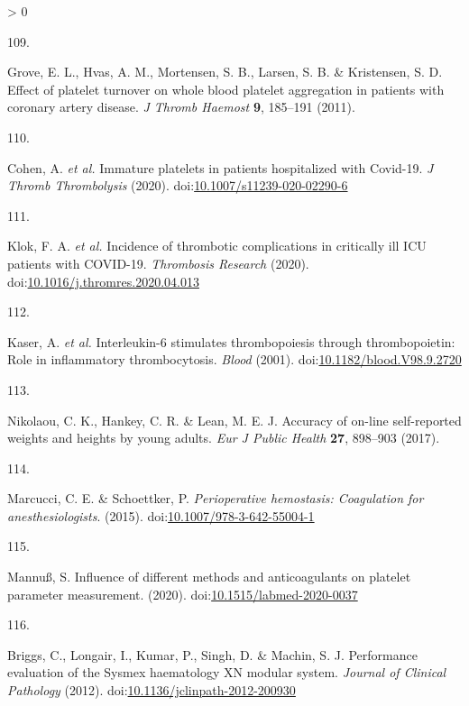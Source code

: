 \documentclass[11pt,twoside]{bristolthesis}
\newlength{\cslhangindent}
\newlength{\csllabelwidth}
\newenvironment{CSLReferences}[2] %
 {%
  \setlength{\parindent}{0pt}
  \ifodd #1 \everypar{\setlength{\hangindent}{\cslhangindent}}\ignorespaces\fi
  \ifnum #2 > 0
  \setlength{\parskip}{#2\baselineskip}
  \fi
 }%
 {}
\newcommand{\CSLLeftMargin}[1]{\parbox[t]{\csllabelwidth}{#1}}
\newcommand{\CSLRightInline}[1]{\parbox[t]{\linewidth - \csllabelwidth}{#1}\break}
\begin{document}
\begin{CSLReferences}{0}{0}
\leavevmode\hypertarget{ref-Grove2011a}{}%
\CSLLeftMargin{109. }
\CSLRightInline{Grove, E. L., Hvas, A. M., Mortensen, S. B., Larsen, S. B. \& Kristensen, S. D. {Effect of platelet turnover on whole blood platelet aggregation in patients with coronary artery disease}. \emph{J Thromb Haemost} \textbf{9}, 185--191 (2011).}

\leavevmode\hypertarget{ref-Cohen2020}{}%
\CSLLeftMargin{110. }
\CSLRightInline{Cohen, A. \emph{et al.} {Immature platelets in patients hospitalized with Covid-19}. \emph{J Thromb Thrombolysis} (2020). doi:\href{https://doi.org/10.1007/s11239-020-02290-6}{10.1007/s11239-020-02290-6}}

\leavevmode\hypertarget{ref-Klok2020}{}%
\CSLLeftMargin{111. }
\CSLRightInline{Klok, F. A. \emph{et al.} {Incidence of thrombotic complications in critically ill ICU patients with COVID-19}. \emph{Thrombosis Research} (2020). doi:\href{https://doi.org/10.1016/j.thromres.2020.04.013}{10.1016/j.thromres.2020.04.013}}

\leavevmode\hypertarget{ref-Kaser2001}{}%
\CSLLeftMargin{112. }
\CSLRightInline{Kaser, A. \emph{et al.} {Interleukin-6 stimulates thrombopoiesis through thrombopoietin: Role in inflammatory thrombocytosis}. \emph{Blood} (2001). doi:\href{https://doi.org/10.1182/blood.V98.9.2720}{10.1182/blood.V98.9.2720}}

\leavevmode\hypertarget{ref-Nikolaou2017}{}%
\CSLLeftMargin{113. }
\CSLRightInline{Nikolaou, C. K., Hankey, C. R. \& Lean, M. E. J. {Accuracy of on-line self-reported weights and heights by young adults}. \emph{Eur J Public Health} \textbf{27}, 898--903 (2017).}

\leavevmode\hypertarget{ref-Marcucci2015}{}%
\CSLLeftMargin{114. }
\CSLRightInline{Marcucci, C. E. \& Schoettker, P. \emph{{Perioperative hemostasis: Coagulation for anesthesiologists}}. (2015). doi:\href{https://doi.org/10.1007/978-3-642-55004-1}{10.1007/978-3-642-55004-1}}

\leavevmode\hypertarget{ref-Mannuuxdf2020}{}%
\CSLLeftMargin{115. }
\CSLRightInline{Mannuß, S. {Influence of different methods and anticoagulants on platelet parameter measurement}. (2020). doi:\href{https://doi.org/10.1515/labmed-2020-0037}{10.1515/labmed-2020-0037}}

\leavevmode\hypertarget{ref-Briggs2012}{}%
\CSLLeftMargin{116. }
\CSLRightInline{Briggs, C., Longair, I., Kumar, P., Singh, D. \& Machin, S. J. {Performance evaluation of the Sysmex haematology XN modular system}. \emph{Journal of Clinical Pathology} (2012). doi:\href{https://doi.org/10.1136/jclinpath-2012-200930}{10.1136/jclinpath-2012-200930}}


\end{CSLReferences}
\end{document}
